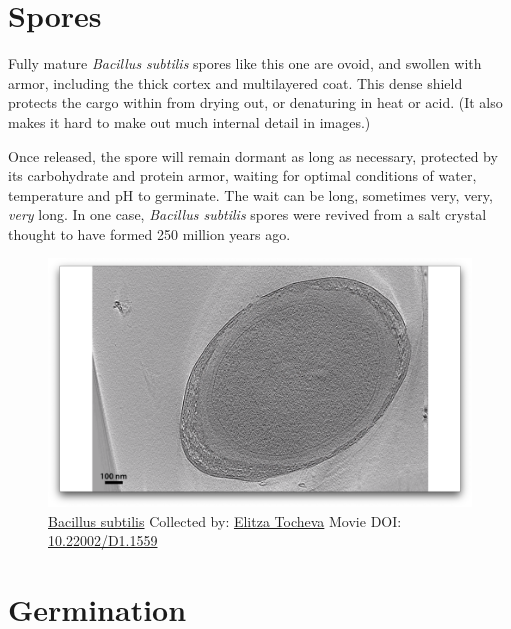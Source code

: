 \documentclass[]{tufte-book}
\begin{document}
\section{Spores}\label{spores}

Fully mature \emph{Bacillus subtilis} spores like this one are ovoid,
and swollen with armor, including the thick cortex and multilayered
coat. This dense shield protects the cargo within from drying out, or
denaturing in heat or acid. (It also makes it hard to make out much
internal detail in images.)

Once released, the spore will remain dormant as long as necessary,
protected by its carbohydrate and protein armor, waiting for optimal
conditions of water, temperature and pH to germinate. The wait can be
long, sometimes very, very, \emph{very} long. In one case,
\emph{Bacillus subtilis} spores were revived from a salt crystal thought
to have formed 250 million years ago.





\begin{figure}
\includegraphics{movie_stills/8_7} \caption[\protect\hyperlink{tree}{Bacillus subtilis} Collected by:
\protect\hyperlink{elitza_tocheva}{Elitza Tocheva} Movie DOI:
\href{https://doi.org/10.22002/D1.1559}{10.22002/D1.1559}]{\protect\hyperlink{tree}{Bacillus subtilis} Collected by:
\protect\hyperlink{elitza_tocheva}{Elitza Tocheva} Movie DOI:
\href{https://doi.org/10.22002/D1.1559}{10.22002/D1.1559}}\label{fig:8-7}
\end{figure}

\section{Germination}\label{germination}
\end{document}
